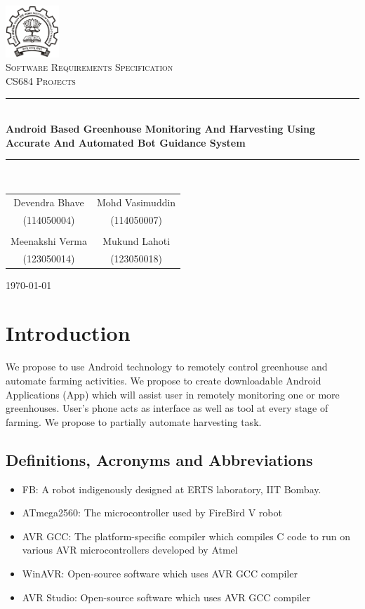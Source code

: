 \documentclass[a4paper, 12pt]{article}
\begin{document}
\begin{titlepage}
 \centering
 \includegraphics[width=0.15\textwidth]{./iitblogo}\\[1.5cm]
 \textsc{\LARGE Software Requirements Specification}\\[1.5cm]
 \textsc{\Large CS684 Projects} \\ [1.5cm]
 \rule{\linewidth}{0.5mm} \\ [0.5cm]
 {\LARGE \textbf{Android Based Greenhouse Monitoring And Harvesting Using Accurate And Automated Bot Guidance System}}
 \rule{\linewidth}{0.5mm}
 \\ [1.5cm]

 \large
 \begin{tabular}{cc}
  Devendra Bhave & Mohd Vasimuddin\\
  (114050004) & (114050007)\\
  \\
  Meenakshi Verma & Mukund Lahoti\\
  (123050014) & (123050018)
 \end{tabular}

 \vspace{2cm}
 \today
\end{titlepage}

\tableofcontents

\newpage

\section{Introduction}
We propose to use Android technology to remotely control greenhouse and automate
farming activities. We propose to create downloadable Android Applications (App)
which will assist user in remotely monitoring one or more greenhouses.
User's phone acts as interface as well as tool at every stage of farming. We propose
to partially automate harvesting task.

\subsection{Definitions, Acronyms and Abbreviations}
\begin{itemize}
 \item FB: A robot indigenously designed at ERTS laboratory, IIT Bombay. \cite{fbhwmanual, fbswmanual, eyantra}
 \item ATmega2560: The microcontroller used by FireBird V robot
 \item AVR GCC: The platform-specific compiler which compiles C code to run on various AVR microcontrollers developed by Atmel
 \item WinAVR: Open-source software which uses AVR GCC compiler
 \item AVR Studio: Open-source software which uses AVR GCC compiler
\end{itemize}
\end{document}
